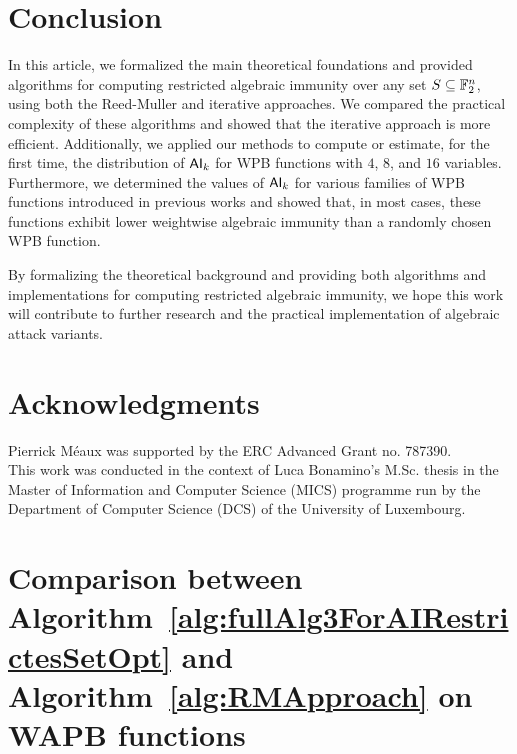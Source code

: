 \documentclass[11pt]{llncs}
\begin{document}
\section{Conclusion}
In this article, we formalized the main theoretical foundations and provided algorithms for computing restricted algebraic immunity over any set $S \subseteq \mathbb{F}_2^n$, using both the Reed-Muller and iterative approaches. 
We compared the practical complexity of these algorithms and showed that the iterative approach is more efficient. 
Additionally, we applied our methods to compute or estimate, for the first time, the distribution of $\mathsf{AI}_k$ for WPB functions with $4$, $8$, and $16$ variables. 
Furthermore, we determined the values of $\mathsf{AI}_k$ for various families of WPB functions introduced in previous works and showed that, in most cases, these functions exhibit lower weightwise algebraic immunity than a randomly chosen WPB function.  

By formalizing the theoretical background and providing both algorithms and implementations for computing restricted algebraic immunity, we hope this work will contribute to further research and the practical implementation of algebraic attack variants. 

\section{Acknowledgments}
Pierrick Méaux was supported by the ERC Advanced Grant no. 787390.\\
This work was conducted in the context of Luca Bonamino’s M.Sc. thesis in the Master of Information and Computer Science (MICS) programme run by the Department of Computer Science (DCS) of the University of Luxembourg.





\ifnum{}


\else


\fi

\appendix
\newpage

\section{Comparison between Algorithm~\ref{alg:fullAlg3ForAIRestrictesSetOpt} and  Algorithm~\ref{alg:RMApproach} on WAPB functions}\label{appendix:algsComparison}
\end{document}
